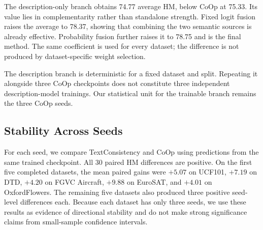 \documentclass[preprint,12pt]{elsarticle}
\begin{document}
\begin{table}[t]
\centering
\caption{Component comparison using HM (\%). The description branch is frozen. Both fusion variants use a fixed weight of 0.5.}
\label{tab:components}
\scriptsize
\setlength{\tabcolsep}{3.2pt}
\end{table}

The description-only branch obtains 74.77 average HM, below CoOp at 75.33. Its value lies in complementarity rather than standalone strength. Fixed logit fusion raises the average to 78.37, showing that combining the two semantic sources is already effective. Probability fusion further raises it to 78.75 and is the final method. The same coefficient is used for every dataset; the difference is not produced by dataset-specific weight selection.

The description branch is deterministic for a fixed dataset and split. Repeating it alongside three CoOp checkpoints does not constitute three independent description-model trainings. Our statistical unit for the trainable branch remains the three CoOp seeds.

\subsection{Stability Across Seeds}

For each seed, we compare TextConsistency and CoOp using predictions from the same trained checkpoint. All 30 paired HM differences are positive. On the first five completed datasets, the mean paired gains were $+5.07$ on UCF101, $+7.19$ on DTD, $+4.20$ on FGVC Aircraft, $+9.88$ on EuroSAT, and $+4.01$ on OxfordFlowers. The remaining five datasets also produced three positive seed-level differences each. Because each dataset has only three seeds, we use these results as evidence of directional stability and do not make strong significance claims from small-sample confidence intervals.
\end{document}
